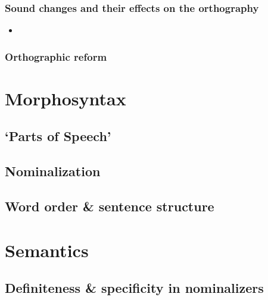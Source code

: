 \documentclass[a4paper,11pt,oneside,openany]{memoir}
\begin{document}
\subsection{Sound changes and their effects on the orthography}

\begin{itemize}
    \item 
\end{itemize}

\subsection{Orthographic reform}

\chapter{Morphosyntax}

\section{`Parts of Speech'}

\section{Nominalization}

\section{Word order \& sentence structure}

\chapter{Semantics}

\section{Definiteness \& specificity in nominalizers}



\end{document}

